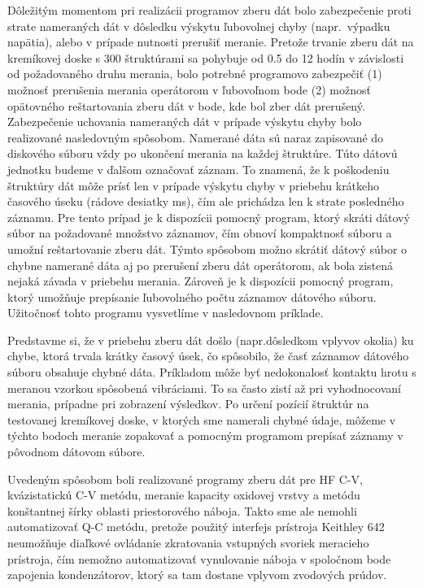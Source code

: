 Dôležitým momentom pri realizácii programov zberu dát bolo
zabezpečenie proti strate nameraných dát v dôsledku výskytu ľubovolnej
chyby (napr.\ výpadku napätia), alebo v prípade nutnosti prerušiť
meranie. Pretože trvanie zberu dát na kremíkovej doske s 300
štruktúrami sa pohybuje od 0.5 do 12 hodín v závislosti od
požadovaného druhu merania, bolo potrebné programovo zabezpečiť (1)
možnosť prerušenia merania operátorom v ľubovoľnom bode (2) možnosť
opätovného reštartovania zberu dát v bode, kde bol zber dát
prerušený. Zabezpečenie uchovania nameraných dát v prípade výskytu
chyby bolo realizované nasledovným spôsobom. Namerané dáta sú naraz
zapisované do diskového súboru vždy po ukončení merania na každej
štruktúre. Túto dátovú jednotku budeme v ďalšom označovať záznam. To
znamená, že k poškodeniu štruktúry dát môže prísť len v prípade
výskytu chyby v priebehu krátkeho časového úseku (rádove desiatky ms),
čím ale prichádza len k strate posledného záznamu. Pre tento prípad je
k dispozícii pomocný program, ktorý skráti dátový súbor na požadované
množstvo záznamov, čím obnoví kompaktnosť súboru a umožní
reštartovanie zberu dát. Týmto spôsobom možno skrátiť dátový súbor o
chybne namerané dáta aj po prerušení zberu dát operátorom, ak bola
zistená nejaká závada v priebehu merania. Zároveň je k dispozícii
pomocný program, ktorý umožňuje prepísanie ľubovolného počtu záznamov
dátového súboru. Užitočnosť tohto programu vysvetlíme v nasledovnom
príklade.

Predstavme si, že v priebehu zberu dát došlo (napr.dôsledkom vplyvov
okolia) ku chybe, ktorá trvala krátky časový úsek, čo spôsobilo, že
časť záznamov dátového súboru obsahuje chybné dáta. Príkladom môže byť
nedokonalosť kontaktu hrotu s meranou vzorkou spôsobená vibráciami. To
sa často zistí až pri vyhodnocovaní merania, prípadne pri zobrazení
výsledkov. Po určení pozícií štruktúr na testovanej kremíkovej doske,
v ktorých sme namerali chybné údaje, môžeme v týchto bodoch meranie
zopakovať a pomocným programom prepísať záznamy v pôvodnom dátovom
súbore.

Uvedeným spôsobom boli realizované programy zberu dát pre HF C-V,
kvázistatickú C-V metódu, meranie kapacity oxidovej vrstvy a metódu
konštantnej šírky oblasti priestorového náboja. Takto sme ale nemohli
automatizovať Q-C metódu, pretože použitý interfejs prístroja Keithley
642 neumožňuje diaľkové ovládanie zkratovania vstupných svoriek
meracieho prístroja, čím nemožno automatizovať vynulovanie náboja v
spoločnom bode zapojenia kondenzátorov, ktorý sa tam dostane vplyvom
zvodových prúdov.

